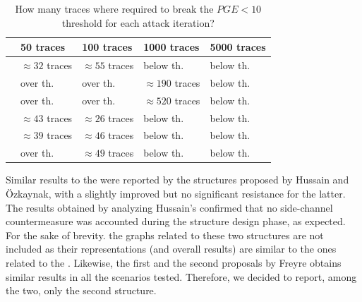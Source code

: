         \begin{table}[]
            \centering
            \begin{tabular}{@{}lllll@{}}
            \toprule
            \sbocs{}     & 50 traces                                  & 100 traces                                 & 1000 traces                                 & 5000 traces                      \\ \midrule
            \xaes{}      & {\color[HTML]{000000} $\approx 32$ traces} & {\color[HTML]{000000} $\approx 55$ traces} & {\color[HTML]{FE0000} below th.}            & {\color[HTML]{FE0000} below th.} \\
            \xfone{}     & {\color[HTML]{009901} over th.}            & {\color[HTML]{009901} over th.}            & {\color[HTML]{000000} $\approx 190$ traces} & {\color[HTML]{FE0000} below th.} \\
            \xftwo{}     & {\color[HTML]{009901} over th.}            & {\color[HTML]{009901} over th.}            & {\color[HTML]{000000} $\approx 520$ traces} & {\color[HTML]{FE0000} below th.} \\
            \xfthree{}    & {\color[HTML]{000000} $\approx 43$ traces} & {\color[HTML]{000000} $\approx 26$ traces} & {\color[HTML]{FE0000} below th.}            & {\color[HTML]{FE0000} below th.} \\
            \xhussain{}  & {\color[HTML]{000000} $\approx 39$ traces} & {\color[HTML]{000000} $\approx 46$ traces} & {\color[HTML]{FE0000} below th.}            & {\color[HTML]{FE0000} below th.} \\
            \xozkaynak{} & {\color[HTML]{009901} over th.}            & {\color[HTML]{000000} $\approx 49$ traces} & {\color[HTML]{FE0000} below th.}            & {\color[HTML]{FE0000} below th.} \\ \bottomrule
            \end{tabular}
            \caption{How many traces where required to break the $PGE < 10$ threshold for each attack iteration?}
            \label{tab:pge_th}
        \end{table}

        Similar results to the \aes{} \sbocs{} were reported by the structures proposed by Hussain and Özkaynak, with a slightly improved but no significant resistance for the latter. The results obtained by analyzing Hussain's \sbocs{} confirmed that no side-channel countermeasure was accounted during the structure design phase, as expected. For the sake of brevity. the graphs related to these two structures are not included as their representations (and overall results) are similar to the ones related to the \aes{} \sbocs{}. Likewise, the first and the second \sbocs{} proposals by Freyre obtains similar results in all the scenarios tested. Therefore, we decided to report, among the two, only the second structure.
        
